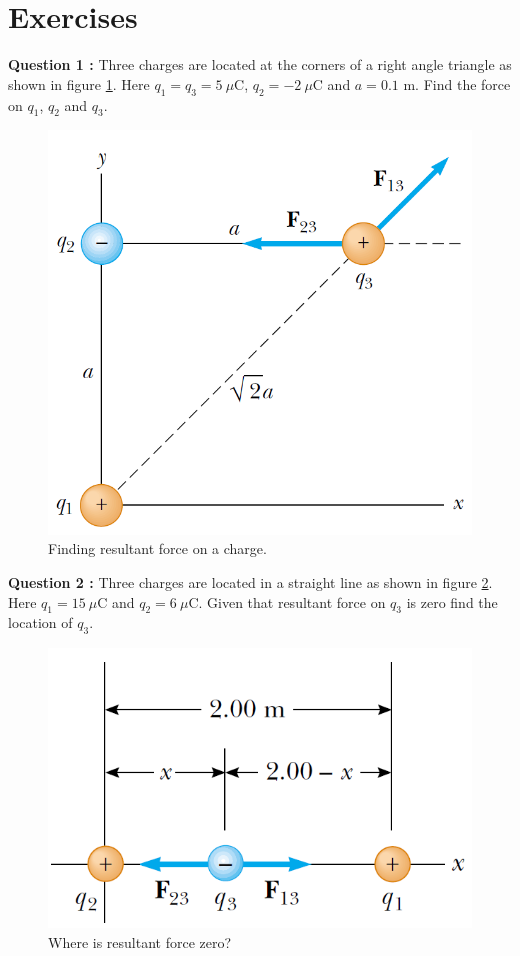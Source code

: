 \documentclass[12pt,a4paper]{article}
\begin{document}
\section{Exercises}
\noindent\textbf{Question 1 \cite[Example 23.2, page 713]{Serway}:} Three charges are located at the corners of a right angle triangle as shown in figure \ref{Resultant-force}. Here $q_1=q_3=5~\mu$C, $q_2=-2~\mu$C and $a=0.1$ m. Find the force on $q_1$, $q_2$ and $q_3$.
\begin{figure}[H]
\centering
\includegraphics[scale=0.5]{Figure23-8.png}
\caption{Finding resultant force on a charge.}
\label{Resultant-force}
\end{figure}
\noindent\textbf{Question 2 \cite[Example 23.3, page 714]{Serway}:} Three charges are located in a straight line as shown in figure \ref{Zero-force}. Here $q_1=15~\mu$C and $q_2=6~\mu$C. Given that resultant force on $q_3$ is zero find the location of $q_3$.
\begin{figure}[H]
\centering
\includegraphics[scale=0.6]{Figure23-9.png}
\caption{Where is resultant force zero?}
\label{Zero-force}
\end{figure}
\end{document}
